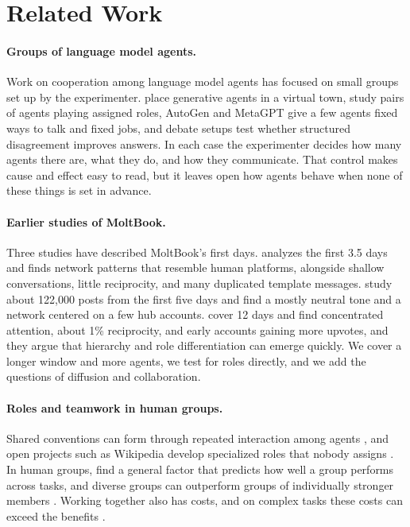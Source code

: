 \documentclass[11pt]{article}
\begin{document}
\section{Related Work}
\label{sec:related}

\paragraph{Groups of language model agents.}
Work on cooperation among language model agents has focused on small groups set up by the experimenter. \citet{park2023generative} place generative agents in a virtual town, \citet{li2023camel} study pairs of agents playing assigned roles, AutoGen \citep{wu2023autogen} and MetaGPT \citep{hong2023metagpt} give a few agents fixed ways to talk and fixed jobs, and debate setups \citep{liang2023encouraging, du2023improving} test whether structured disagreement improves answers. In each case the experimenter decides how many agents there are, what they do, and how they communicate. That control makes cause and effect easy to read, but it leaves open how agents behave when none of these things is set in advance.

\paragraph{Earlier studies of MoltBook.}
Three studies have described MoltBook's first days. \citet{holtz2026anatomy} analyzes the first 3.5 days and finds network patterns that resemble human platforms, alongside shallow conversations, little reciprocity, and many duplicated template messages. \citet{li2026rise} study about 122,000 posts from the first five days and find a mostly neutral tone and a network centered on a few hub accounts. \citet{price2026claws} cover 12 days and find concentrated attention, about 1\% reciprocity, and early accounts gaining more upvotes, and they argue that hierarchy and role differentiation can emerge quickly. We cover a longer window and more agents, we test for roles directly, and we add the questions of diffusion and collaboration.

\paragraph{Roles and teamwork in human groups.}
Shared conventions can form through repeated interaction among agents \citep{lazaridou2020emergent, mordatch2018emergence}, and open projects such as Wikipedia develop specialized roles that nobody assigns \citep{kittur2007harnessing}. In human groups, \citet{woolley2010evidence} find a general factor that predicts how well a group performs across tasks, and diverse groups can outperform groups of individually stronger members \citep{hong2004diverse}. Working together also has costs, and on complex tasks these costs can exceed the benefits \citep{straub2023coordination}.
\end{document}
